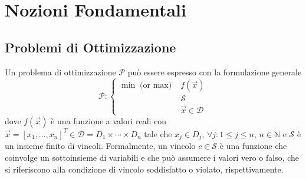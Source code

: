 \chapter{Nozioni Fondamentali}

\section{Problemi di Ottimizzazione}
Un problema di ottimizzazione $\mathcal{P}$ può essere espresso con la
formulazione generale
\begin{equation}\label{eq:opt_prob}
    \mathcal{P} \colon
    \begin{cases}
        \min \text{(or $\max$)} & f(\vec{x}) \\
                                & \mathcal{S} \\
                                & \vec{x} \in \mathcal{D}
    \end{cases}
\end{equation}
dove $f(\vec{x})$ è una funzione a valori reali con $\vec{x} = [x_{1},
\ldots, x_{n}]^T \in \mathcal{D} = D_{1} \times \cdots \times D_{n}$ tale
che $x_{j} \in D_{j},\, \forall j\colon 1 \le j \le n,\, n \in \mathbb{N}$
e $\mathcal{S}$ è un insieme finito di vincoli. Formalmente, un vincolo $c
\in \mathcal{S}$ è una funzione che coinvolge un sottoinsieme di variabili
e che può assumere i valori vero o falso, che si riferiscono alla
condizione di vincolo soddisfatto o violato, rispettivamente.

